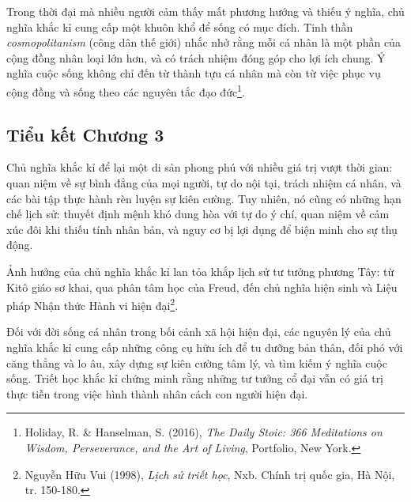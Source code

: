 Trong thời đại mà nhiều người cảm thấy mất phương hướng và thiếu ý nghĩa, chủ nghĩa khắc kỉ cung cấp một khuôn khổ để sống có mục đích. Tinh thần \textit{cosmopolitanism} (công dân thế giới) nhắc nhở rằng mỗi cá nhân là một phần của cộng đồng nhân loại lớn hơn, và có trách nhiệm đóng góp cho lợi ích chung. Ý nghĩa cuộc sống không chỉ đến từ thành tựu cá nhân mà còn từ việc phục vụ cộng đồng và sống theo các nguyên tắc đạo đức\footnote{Holiday, R. \& Hanselman, S. (2016), \textit{The Daily Stoic: 366 Meditations on Wisdom, Perseverance, and the Art of Living}, Portfolio, New York.}.

\subsection*{Tiểu kết Chương 3}

Chủ nghĩa khắc kỉ để lại một di sản phong phú với nhiều giá trị vượt thời gian: quan niệm về sự bình đẳng của mọi người, tự do nội tại, trách nhiệm cá nhân, và các bài tập thực hành rèn luyện sự kiên cường. Tuy nhiên, nó cũng có những hạn chế lịch sử: thuyết định mệnh khó dung hòa với tự do ý chí, quan niệm về cảm xúc đôi khi thiếu tính nhân bản, và nguy cơ bị lợi dụng để biện minh cho sự thụ động.

Ảnh hưởng của chủ nghĩa khắc kỉ lan tỏa khắp lịch sử tư tưởng phương Tây: từ Kitô giáo sơ khai, qua phân tâm học của Freud, đến chủ nghĩa hiện sinh và Liệu pháp Nhận thức Hành vi hiện đại\footnote{Nguyễn Hữu Vui (1998), \textit{Lịch sử triết học}, Nxb. Chính trị quốc gia, Hà Nội, tr. 150-180.}.

Đối với đời sống cá nhân trong bối cảnh xã hội hiện đại, các nguyên lý của chủ nghĩa khắc kỉ cung cấp những công cụ hữu ích để tu dưỡng bản thân, đối phó với căng thẳng và lo âu, xây dựng sự kiên cường tâm lý, và tìm kiếm ý nghĩa cuộc sống. Triết học khắc kỉ chứng minh rằng những tư tưởng cổ đại vẫn có giá trị thực tiễn trong việc hình thành nhân cách con người hiện đại.
